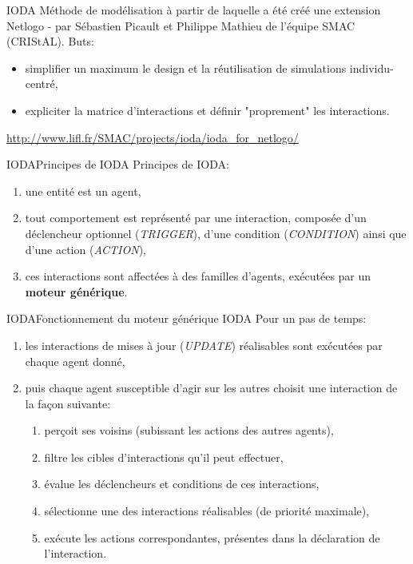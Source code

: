 \documentclass[t, 10pt]{beamer}
\begin{document}
	\begin{frame}[c]{IODA}
			Méthode de modélisation à partir de laquelle a été créé une extension Netlogo - par Sébastien Picault et Philippe Mathieu de l'équipe SMAC (CRIStAL).
			\vfill
			\pause
			Buts:
			\begin{itemize}
			\item{simplifier un maximum le design et la réutilisation de simulations individu-centré,}
			\item{expliciter la matrice d'interactions et définir "proprement" les interactions.}
			\end{itemize}
			\vfill
			\url{http://www.lifl.fr/SMAC/projects/ioda/ioda_for_netlogo/}
	\end{frame}
	
	\begin{frame}[c]{IODA}{Principes de IODA}
			Principes de IODA:
			\begin{enumerate}
				\item{une entité est un agent,}
				\item{tout comportement est représenté par une interaction, composée d'un déclencheur optionnel (\textit{TRIGGER}), d'une condition (\textit{CONDITION}) ainsi que d'une action (\textit{ACTION}),}
				\item{ces interactions sont affectées à des familles d'agents, exécutées par un \textbf{moteur générique}.}
			\end{enumerate}
			\newline
			\color{red}{C'est le moteur qui détermine quelles interactions peuvent avoir lieu lors d'un pas de temps.}
	\end{frame}
	
	\begin{frame}[c]{IODA}{Fonctionnement du moteur générique IODA}
		Pour un pas de temps:
		\begin{enumerate}
			\item{les interactions de mises à jour (\textit{UPDATE}) réalisables sont exécutées par chaque agent donné,}
			\item{puis chaque agent susceptible d'agir sur les autres choisit une interaction de la façon suivante:
			\begin{enumerate}
				\item{perçoit ses voisins (subissant les actions des autres agents),}
				\item{filtre les cibles d'interactions qu'il peut effectuer,}
				\item{évalue les déclencheurs et conditions de ces interactions,}
				\item{sélectionne une des interactions réalisables (de priorité maximale),}
				\item{exécute les actions correspondantes, présentes dans la déclaration de l'interaction.}
			\end{enumerate}
			}
		\end{enumerate}
	\end{frame}
	
\end{document}
